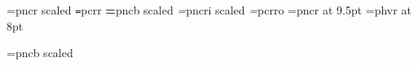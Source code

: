 \def\leadline{\ \leaders\hrule height 2.5pt depth -2pt\hfil\ }
\def\manvers{}%
\def\HEADINGSoff{
\global\evenheadline={\hfil}
\global\evenfootline={\line{\let\,\leadline\manvers}}
\global\oddheadline={\hfil}
\global\oddfootline={\line {\let\,\leadline\manvers}}}
\def\HEADINGSsingle{
\global\pageno=1\HEADINGSsinglex}
\def\HEADINGSsinglex{
\global\evenfootline={%
\leadline\manvers}
\global\oddfootline={%
\leadline\manvers}
\global\evenheadline={\ftfnt\thischapter\leadline
		\ifdraft DRAFT\leadline\fi
		\bf\folio}
\global\oddheadline={\ftfnt\thischapter\leadline
		\ifdraft DRAFT\leadline\fi
		\bf\folio}
}
%
\def\HEADINGSdouble{
\global\pageno=1\HEADINGSdoublex}
\def\HEADINGSdoublex{
\global\evenfootline={%
{\bf\folio}\ftfnt\leadline\ifdraft DRAFT\quad\fi
\ftfnt\manvers\kern 0pt
}
\ifx\specialOddFootline\undefined
\global\oddfootline={%
\leadline{\bf\folio}%
}
\else
\global\oddfootline=\specialOddFootline
\fi
\global\evenheadline={\ftfnt\thistitle\leadline\ifdraft DRAFT\fi}
\global\oddheadline={\rm\leadline\thischapter}
}

\def\finalout{\overfullrule=0pt
	\global\draftfalse
			}

\font\textrm=pncr scaled \magstephalf
\font\texttt=pcrr
\font\textbf=pncb scaled \magstephalf 
\font\textit=pncri scaled \magstephalf
\font\textsl=pcrro
\font\textsf=pncr at 9.5pt
\font\ftfnt=phvr at 8pt %

\font{}=pncb scaled  %


